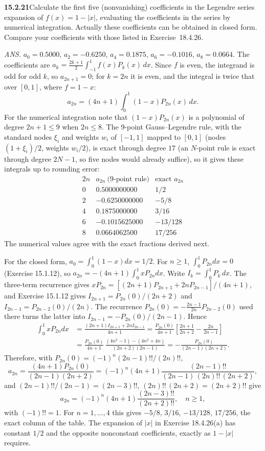 \par\bigskip
\noindent\textbf{15.2.21}\quad Calculate the first five (nonvanishing)
coefficients in the Legendre series expansion of $f(x)=1-|x|$,
evaluating the coefficients in the series by numerical integration.
Actually these coefficients can be obtained in closed form. Compare
your coefficients with those listed in Exercise~18.4.26.
\par\nobreak\hfill\emph{ANS.}\enspace
$a_{0}=0.5000$, $a_{2}=-0.6250$, $a_{4}=0.1875$, $a_{6}=-0.1016$,
$a_{8}=0.0664$.
\solution
The coefficients are $a_k=\frac{2k+1}2\int_{-1}^1f(x)P_k(x)\,dx$.
Since $f$ is even, the integrand is odd for odd $k$, so $a_{2n+1}=0$;
for $k=2n$ it is even, and the integral is twice that over $[0,1]$,
where $f=1-x$:
\[
a_{2n}=(4n+1)\int_0^1(1-x)P_{2n}(x)\,dx.
\]
For the numerical integration note that $(1-x)P_{2n}(x)$ is a
polynomial of degree $2n+1\le9$ when $2n\le8$. The 9-point
Gauss--Legendre rule, with the standard nodes $\xi_i$ and weights $w_i$
of $[-1,1]$ mapped to $[0,1]$ (nodes $(1+\xi_i)/2$, weights $w_i/2$),
is exact through degree $17$ (an $N$-point rule is exact through
degree $2N-1$, so five nodes would already suffice), so it gives these
integrals up to rounding error:
\[
\begin{array}{c|r|c}
2n&a_{2n}\ \text{(9-point rule)}&\text{exact }a_{2n}\\\hline
0&0.5000000000&1/2\\
2&-0.6250000000&-5/8\\
4&0.1875000000&3/16\\
6&-0.1015625000&-13/128\\
8&0.0664062500&17/256
\end{array}
\]
The numerical values agree with the exact fractions derived next.

For the closed form, $a_0=\int_0^1(1-x)dx=1/2$.
For $n\ge1$, $\int_0^1P_{2n}dx=0$ (Exercise 15.1.12), so
$a_{2n}=-(4n+1)\int_0^1xP_{2n}dx$.
Write $I_k=\int_0^1P_k\,dx$. The three-term recurrence gives
$xP_{2n}=[(2n+1)P_{2n+1}+2nP_{2n-1}]/(4n+1)$, and Exercise 15.1.12
gives $I_{2n+1}=P_{2n}(0)/(2n+2)$ and $I_{2n-1}=P_{2n-2}(0)/(2n)$.
The recurrence $P_{2n}(0)=-\frac{2n-1}{2n}P_{2n-2}(0)$ used there turns
the latter into $I_{2n-1}=-P_{2n}(0)/(2n-1)$. Hence
\begin{align*}
\int_0^1xP_{2n}dx
&=\frac{(2n+1)I_{2n+1}+2nI_{2n-1}}{4n+1}
=\frac{P_{2n}(0)}{4n+1}
 \left[\frac{2n+1}{2n+2}-\frac{2n}{2n-1}\right]\\
&=\frac{P_{2n}(0)}{4n+1}\,
 \frac{(4n^2-1)-(4n^2+4n)}{(2n+2)(2n-1)}
=-\frac{P_{2n}(0)}{(2n-1)(2n+2)}.
\end{align*}
Therefore, with $P_{2n}(0)=(-1)^n(2n-1)!!/(2n)!!$,
\[
a_{2n}=\frac{(4n+1)P_{2n}(0)}{(2n-1)(2n+2)}
=(-1)^n(4n+1)\frac{(2n-1)!!}{(2n-1)\,(2n)!!\,(2n+2)},
\]
and $(2n-1)!!/(2n-1)=(2n-3)!!$, $(2n)!!\,(2n+2)=(2n+2)!!$ give
\[
\boxed{a_{2n}=(-1)^n(4n+1)\frac{(2n-3)!!}{(2n+2)!!}},\quad n\ge1,
\]
with $(-1)!!=1$. For $n=1,\ldots,4$ this gives $-5/8$, $3/16$,
$-13/128$, $17/256$, the exact column of the table.
The expansion of $|x|$ in Exercise 18.4.26(a) has constant $1/2$ and
the opposite nonconstant coefficients, exactly as $1-|x|$ requires.

